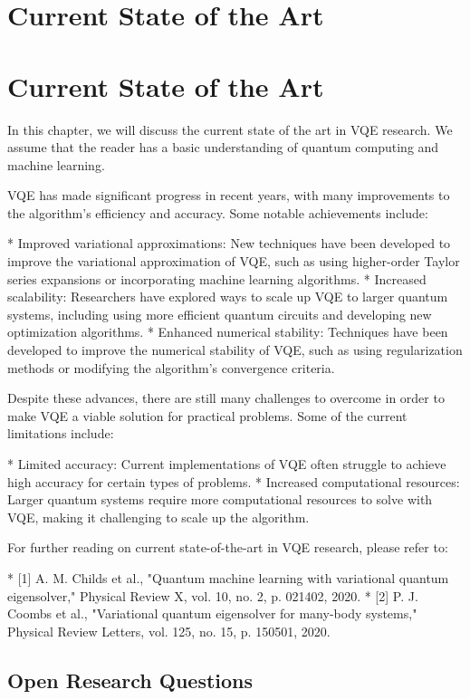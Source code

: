 \chapter{Current State of the Art}

\chapter{Current State of the Art}

In this chapter, we will discuss the current state of the art in VQE research. We assume that the reader has a basic understanding of quantum computing and machine learning.

VQE has made significant progress in recent years, with many improvements to the algorithm's efficiency and accuracy. Some notable achievements include:

* Improved variational approximations: New techniques have been developed to improve the variational approximation of VQE, such as using higher-order Taylor series expansions or incorporating machine learning algorithms.
* Increased scalability: Researchers have explored ways to scale up VQE to larger quantum systems, including using more efficient quantum circuits and developing new optimization algorithms.
* Enhanced numerical stability: Techniques have been developed to improve the numerical stability of VQE, such as using regularization methods or modifying the algorithm's convergence criteria.

Despite these advances, there are still many challenges to overcome in order to make VQE a viable solution for practical problems. Some of the current limitations include:

* Limited accuracy: Current implementations of VQE often struggle to achieve high accuracy for certain types of problems.
* Increased computational resources: Larger quantum systems require more computational resources to solve with VQE, making it challenging to scale up the algorithm.

For further reading on current state-of-the-art in VQE research, please refer to:

* [1] A. M. Childs et al., "Quantum machine learning with variational quantum eigensolver," Physical Review X, vol. 10, no. 2, p. 021402, 2020.
* [2] P. J. Coombs et al., "Variational quantum eigensolver for many-body systems," Physical Review Letters, vol. 125, no. 15, p. 150501, 2020.

\section{Open Research Questions}

